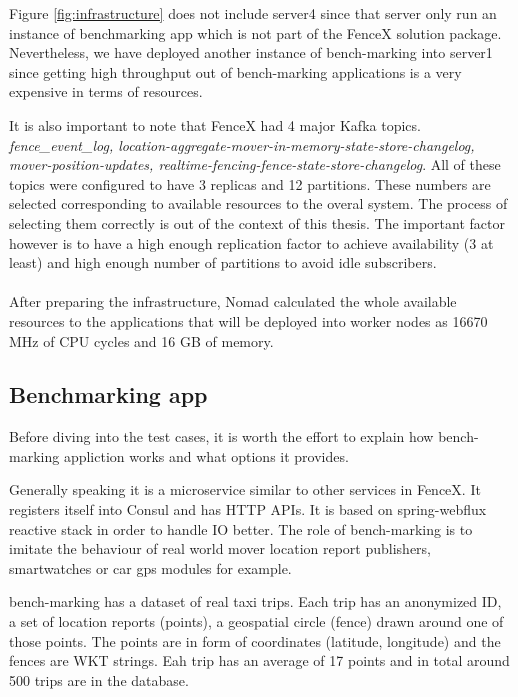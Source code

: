 \documentclass[a4]{report}
\begin{document}
    Figure \ref{fig:infrastructure} does not include server4 since that server only run an instance of benchmarking app
    which is not part of the FenceX solution package.
    Nevertheless, we have deployed another instance of bench-marking into server1 since getting high throughput out of
    bench-marking applications is a very expensive in terms of resources.

    It is also important to note that FenceX had 4 major Kafka topics.
    \textit{fence\_event\_log, location-aggregate-mover-in-memory-state-store-changelog, mover-position-updates,
        realtime-fencing-fence-state-store-changelog}.
    All of these topics were configured to have 3 replicas and 12 partitions.
    These numbers are selected corresponding to available resources to the overal system.
    The process of selecting them correctly is out of the context of this thesis.
    The important factor however is to have a high enough replication factor to achieve availability (3 at least) and
    high enough number of partitions to avoid idle subscribers.

    \paragraph{}
    After preparing the infrastructure, Nomad calculated the whole available resources to the applications that will
    be deployed into worker nodes as 16670 MHz of CPU cycles and 16 GB of memory.

    \subsection{Benchmarking app}
    Before diving into the test cases, it is worth the effort to explain how bench-marking appliction works and what
    options it provides.

    Generally speaking it is a microservice similar to other services in FenceX.
    It registers itself into Consul and has HTTP APIs.
    It is based on spring-webflux reactive stack in order to handle IO better.
    The role of bench-marking is to imitate the behaviour of real world mover location report publishers,
    smartwatches or car gps modules for example.

    bench-marking has a dataset of real taxi trips.
    Each trip has an anonymized ID, a set of location reports (points), a geospatial circle (fence) drawn around one
    of those points.
    The points are in form of coordinates (latitude, longitude) and the fences are WKT strings.
    Eah trip has an average of 17 points and in total around 500 trips are in the database.
\end{document}
